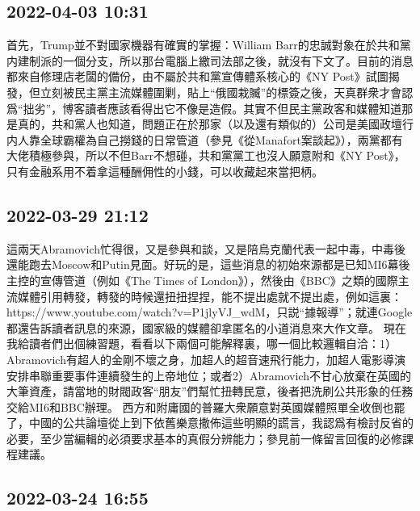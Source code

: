 \documentclass[twocolumn]{ctexart}
\begin{document}
\subsection*{2022-04-03 10:31}

首先，Trump並不對國家機器有確實的掌握：William Barr的忠誠對象在於共和黨内建制派的一個分支，所以那台電腦上繳司法部之後，就沒有下文了。目前的消息都來自修理店老闆的備份，由不屬於共和黨宣傳體系核心的《NY Post》試圖揭發，但立刻被民主黨主流媒體圍剿，貼上“俄國栽贓”的標簽之後，天真群衆才會認爲“拙劣”，博客讀者應該看得出它不像是造假。其實不但民主黨政客和媒體知道那是真的，共和黨人也知道，問題正在於那家（以及還有類似的）公司是美國政壇行内人靠全球霸權為自己撈錢的日常管道（參見《從Manafort案談起》），兩黨都有大佬積極參與，所以不但Barr不想碰，共和黨黨工也沒人願意附和《NY Post》，只有金融系用不着拿這種酬佣性的小錢，可以收藏起來當把柄。
\subsection*{2022-03-29 21:12}

這兩天Abramovich忙得很，又是參與和談，又是陪烏克蘭代表一起中毒，中毒後還能跑去Moscow和Putin見面。好玩的是，這些消息的初始來源都是已知MI6幕後主控的宣傳管道（例如《The Times of London》），然後由《BBC》之類的國際主流媒體引用轉發，轉發的時候還扭扭捏捏，能不提出處就不提出處，例如這裏：https://www.youtube.com/watch?v=P1jlyVJ\_wdM，只説“據報導”；就連Google都還告訴讀者訊息的來源，國家級的媒體卻拿匿名的小道消息來大作文章。
現在我給讀者們出個練習題，看看以下兩個可能解釋裏，哪一個比較邏輯自洽：1）Abramovich有超人的金剛不壞之身，加超人的超音速飛行能力，加超人電影導演安排串聯重要事件連續發生的上帝地位；或者2）Abramovich不甘心放棄在英國的大筆資產，請當地的財閥政客“朋友”們幫忙扭轉民意，後者把洗刷公共形象的任務交給MI6和BBC辦理。
西方和附庸國的普羅大衆願意對英國媒體照單全收倒也罷了，中國的公共論壇從上到下依舊樂意撒佈這些明顯的謊言，我認爲有檢討反省的必要，至少當編輯的必須要求基本的真假分辨能力；參見前一條留言回復的必修課程建議。
\subsection*{2022-03-24 16:55}
\end{document}
